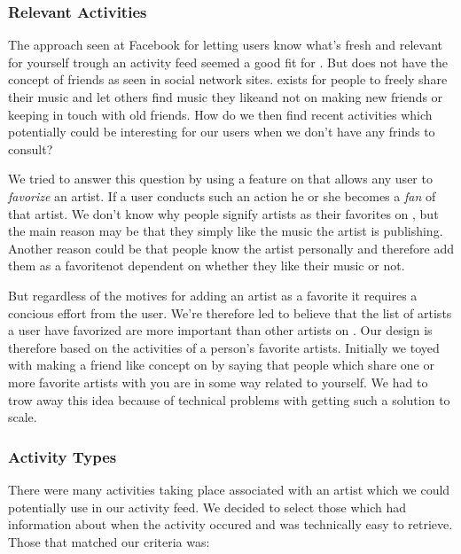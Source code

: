 \subsubsection{Relevant Activities}

The approach seen at Facebook for letting users know what's fresh and relevant
for yourself trough an activity feed seemed a good fit for \urort{}. But
\urort{} does not have the concept of friends as seen in social network sites.
\urort{} exists for people to freely share their music and let others find
music they like\dash{}and not on making new friends or keeping in touch with
old friends. How do we then find recent activities which potentially could be
interesting for our users when we don't have any frinds to consult?

We tried to answer this question by using a feature on \urort{} that allows
any user to \emph{favorize} an artist. If a user conducts such an action he or
she becomes a \emph{fan} of that artist. We don't know why people signify
artists as their favorites on \urort{}, but the main reason may be that
they simply like the music the artist is publishing.
Another reason could be that people know the artist personally and therefore
add them as a favorite\dash{}not dependent on whether they like their music or
not.

But regardless of the motives for adding an artist as a favorite it requires
a concious effort from the user. We're therefore led to believe that the list
of artists a user have favorized are more important than other artists on
\urort{}. Our design is therefore based on the activities of a person's
favorite artists. Initially we toyed with making a friend like concept on
\urort{} by saying that people which share one or more favorite artists with
you are in some way related to yourself. We had to trow away this idea because
of technical problems with getting such a solution to scale.

\subsubsection{Activity Types}

There were many activities taking place associated with an artist
which we could potentially use in our activity feed. We decided to select
those which had information about when the activity occured and was
technically easy%
to retrieve. Those that matched our criteria was:

